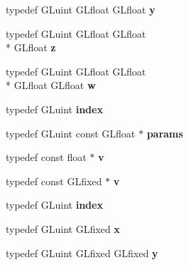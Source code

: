 \begin{DoxyCompactItemize}
\item 
\hypertarget{class_c_p_v_r_tgles_ext_a01d2cc93f26c9ccb6a063172122627f8}{typedef G\+Luint G\+Lfloat G\+Lfloat {\bfseries y}}\label{class_c_p_v_r_tgles_ext_a01d2cc93f26c9ccb6a063172122627f8}

\item 
\hypertarget{class_c_p_v_r_tgles_ext_a4eeafad74af90d765d30d7d1c129c7ef}{typedef G\+Luint G\+Lfloat G\+Lfloat \\*
G\+Lfloat {\bfseries z}}\label{class_c_p_v_r_tgles_ext_a4eeafad74af90d765d30d7d1c129c7ef}

\item 
\hypertarget{class_c_p_v_r_tgles_ext_a26510c8cc4b657be6a70257c8b035371}{typedef G\+Luint G\+Lfloat G\+Lfloat \\*
G\+Lfloat G\+Lfloat {\bfseries w}}\label{class_c_p_v_r_tgles_ext_a26510c8cc4b657be6a70257c8b035371}

\item 
\hypertarget{class_c_p_v_r_tgles_ext_a8c371b922a8940951930ac226e844106}{typedef G\+Luint {\bfseries index}}\label{class_c_p_v_r_tgles_ext_a8c371b922a8940951930ac226e844106}

\item 
\hypertarget{class_c_p_v_r_tgles_ext_a7e63e0aa709a61f5dcd282866a4504f4}{typedef G\+Luint const G\+Lfloat $\ast$ {\bfseries params}}\label{class_c_p_v_r_tgles_ext_a7e63e0aa709a61f5dcd282866a4504f4}

\item 
\hypertarget{class_c_p_v_r_tgles_ext_aed4e12b3865e6cc9a73f3a0a41fad0e1}{typedef const float $\ast$ {\bfseries v}}\label{class_c_p_v_r_tgles_ext_aed4e12b3865e6cc9a73f3a0a41fad0e1}

\item 
\hypertarget{class_c_p_v_r_tgles_ext_a5f364528329211a814a22b7603aea689}{typedef const G\+Lfixed $\ast$ {\bfseries v}}\label{class_c_p_v_r_tgles_ext_a5f364528329211a814a22b7603aea689}

\item 
\hypertarget{class_c_p_v_r_tgles_ext_a8c371b922a8940951930ac226e844106}{typedef G\+Luint {\bfseries index}}\label{class_c_p_v_r_tgles_ext_a8c371b922a8940951930ac226e844106}

\item 
\hypertarget{class_c_p_v_r_tgles_ext_a2d14aa1d3113e6acf0c537f1eae373de}{typedef G\+Luint G\+Lfixed {\bfseries x}}\label{class_c_p_v_r_tgles_ext_a2d14aa1d3113e6acf0c537f1eae373de}

\item 
\hypertarget{class_c_p_v_r_tgles_ext_a50ad84394f2c9ea9eeaa5e048ce3c3e5}{typedef G\+Luint G\+Lfixed G\+Lfixed {\bfseries y}}\label{class_c_p_v_r_tgles_ext_a50ad84394f2c9ea9eeaa5e048ce3c3e5}


\end{DoxyCompactItemize}
